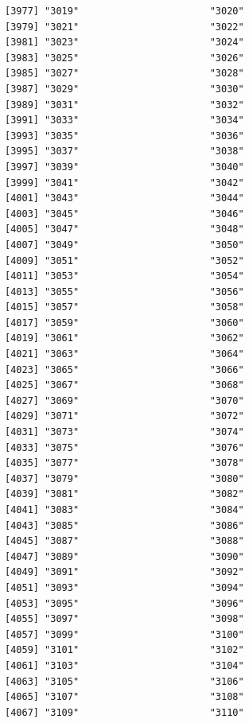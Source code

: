 \documentclass[
  letterpaper,
  DIV=11,
  numbers=noendperiod]{scrreprt}
\begin{document}
\begin{verbatim}
[3977] "3019"                       "3020"                      
[3979] "3021"                       "3022"                      
[3981] "3023"                       "3024"                      
[3983] "3025"                       "3026"                      
[3985] "3027"                       "3028"                      
[3987] "3029"                       "3030"                      
[3989] "3031"                       "3032"                      
[3991] "3033"                       "3034"                      
[3993] "3035"                       "3036"                      
[3995] "3037"                       "3038"                      
[3997] "3039"                       "3040"                      
[3999] "3041"                       "3042"                      
[4001] "3043"                       "3044"                      
[4003] "3045"                       "3046"                      
[4005] "3047"                       "3048"                      
[4007] "3049"                       "3050"                      
[4009] "3051"                       "3052"                      
[4011] "3053"                       "3054"                      
[4013] "3055"                       "3056"                      
[4015] "3057"                       "3058"                      
[4017] "3059"                       "3060"                      
[4019] "3061"                       "3062"                      
[4021] "3063"                       "3064"                      
[4023] "3065"                       "3066"                      
[4025] "3067"                       "3068"                      
[4027] "3069"                       "3070"                      
[4029] "3071"                       "3072"                      
[4031] "3073"                       "3074"                      
[4033] "3075"                       "3076"                      
[4035] "3077"                       "3078"                      
[4037] "3079"                       "3080"                      
[4039] "3081"                       "3082"                      
[4041] "3083"                       "3084"                      
[4043] "3085"                       "3086"                      
[4045] "3087"                       "3088"                      
[4047] "3089"                       "3090"                      
[4049] "3091"                       "3092"                      
[4051] "3093"                       "3094"                      
[4053] "3095"                       "3096"                      
[4055] "3097"                       "3098"                      
[4057] "3099"                       "3100"                      
[4059] "3101"                       "3102"                      
[4061] "3103"                       "3104"                      
[4063] "3105"                       "3106"                      
[4065] "3107"                       "3108"                      
[4067] "3109"                       "3110"                      
\end{verbatim}
\end{document}
